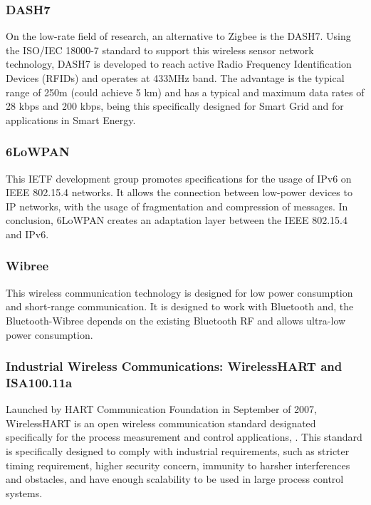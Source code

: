 \subsubsection{DASH7}

On the low-rate field of research, an alternative to Zigbee is the DASH7. Using the ISO/IEC 18000-7 standard to support this wireless sensor network technology, DASH7 is developed to reach active Radio Frequency Identification Devices (RFIDs) and operates at 433MHz band. The advantage is the typical range of 250m (could achieve 5 km) and has a typical and maximum data rates of 28 kbps and 200 kbps, being this specifically designed for Smart Grid and for applications in Smart Energy.


\subsubsection{6LoWPAN}

This IETF development group promotes specifications for the usage of IPv6 on IEEE 802.15.4 networks. It allows the connection between low-power devices to \ac{IP} networks, with the usage of fragmentation and compression of messages. In conclusion, 6LoWPAN creates an adaptation layer between the IEEE 802.15.4 and IPv6.



\subsubsection{Wibree}

This wireless communication technology is designed for low power consumption and short-range communication. It is designed to work with Bluetooth and, the Bluetooth-Wibree depends on the existing Bluetooth RF and allows ultra-low power consumption.


\subsubsection{Industrial Wireless Communications: WirelessHART and ISA100.11a}

Launched by HART Communication Foundation in September of 2007, WirelessHART is an open wireless communication standard designated specifically for the process measurement and control applications, \cite{Song2008}. This standard is specifically designed to comply with industrial requirements, such as stricter timing requirement, higher security concern, immunity to harsher interferences and obstacles, and have enough scalability to be used in large process control systems.

